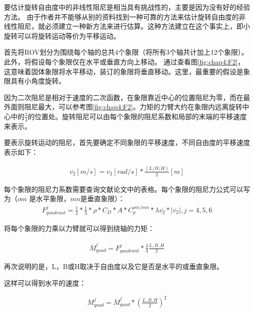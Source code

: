 要估计旋转自由度中的非线性阻尼是相当具有挑战性的，主要是因为没有好的经验方法。 由于作者并不能够从别的资料找到一种可靠的方法来估计旋转自由度的非线性阻尼，就必须建立一种新方法来进行估算。这种方法建立在这个事实上，即小旋转可以将旋转运动等价为平移运动。

首先将ROV划分为围绕每个轴的总共4个象限（将所有3个轴共计加上12个象限）。此外，将假设每个象限仅在水平或垂直方向上移动。 通过查看图\ref{fig:chap4:F2}，这意味着固体象限将水平移动，装订的象限将垂直移动。这里，最重要的假设是象限具有小角度旋转。

因为二次阻尼是相对于速度的二次函数，在象限靠近中心的位置阻尼为零，而在最外面则阻尼最大，可以参考图\ref{fig:chap4:F2}。力矩的力臂大约在象限内远离旋转中心中的$\frac{3}{4}$的位置处。旋转阻尼可以由每个象限的阻尼系数和局部的末端的平移速度来表示。

要表示旋转运动的阻尼，首先要确定不同象限的平移速度，不同自由度的平移速度表示如下：

\begin{equation}
\begin{aligned}
\overline{v_2} [m/s] = v_2 [rad/s] \ast \frac{(L/B/H)}{2}[m]
\end{aligned}
\end{equation}

每个象限的阻尼力系数需要查询文献论文中的表格\cite{eidsvik2015identification}。每个象限的阻尼力公式可以写为（$om$ 是水平象限，$mn$是垂直象限）：
\begin{equation}
\begin{aligned}
F_{quadrant}^{j} = \frac{1}{2} \ast \frac{1}{3} \ast \rho \ast C_D \ast A \ast  C_p^{om/mn} \ast  \lambda \overline{v_2} \ast | \overline{v_2}|, j = 4, 5, 6
\end{aligned}
\end{equation}

将每个象限的力乘以力臂就可以得到绕轴的力矩：


\begin{equation}
\begin{aligned}
 \overline{M}_{quad}^j= F_{quadrant}^{j} \ast \frac{3}{4} \frac{L,B,H}{2}
\end{aligned}
\end{equation}

再次说明的是，L，B或H取决于自由度以及它是否是水平的或垂直象限。

这样可以得到水平的速度：

\begin{equation}
\begin{aligned}
M_{quad}^{j} = \overline{M}_{quad}^{j} \ast (\frac{L,B,H}{2}) ^2
\end{aligned}
\end{equation}

